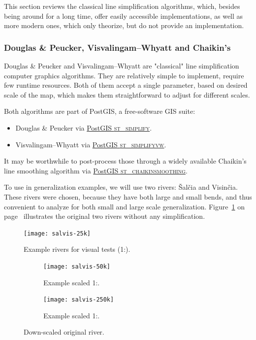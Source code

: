 \documentclass[a4paper]{article}
\newcommand{\onpage}[1]{\ref{#1} on page~\pageref{#1}}
\newcommand{\DP}{Douglas \& Peucker}
\newcommand{\VW}{Visvalingam--Whyatt}
\begin{document}
This section reviews the classical line simplification algorithms, which,
besides being around for a long time, offer easily accessible implementations,
as well as more modern ones, which only theorize, but do not provide an
implementation.

\subsubsection{{\DP}, {\VW} and Chaikin's}
\label{sec:dp-vw-chaikin}

{\DP}\cite{douglas1973algorithms} and {\VW}\cite{visvalingam1993line} are
"classical" line simplification computer graphics algorithms. They are
relatively simple to implement, require few runtime resources. Both of them
accept a single parameter, based on desired scale of the map, which makes them
straightforward to adjust for different scales.

Both algorithms are part of PostGIS, a free-software GIS suite:
\begin{itemize}
    \item {\DP} via
        \href{https://postgis.net/docs/ST_Simplify.html}{PostGIS \textsc{st\_simplify}}.

    \item {\VW} via
        \href{https://postgis.net/docs/ST_SimplifyVW.html}{PostGIS
        \textsc{st\_simplifyvw}}.
\end{itemize}

It may be worthwhile to post-process those through a widely available Chaikin's
line smoothing algorithm\cite{chaikin1974algorithm} via
\href{https://postgis.net/docs/ST_ChaikinSmoothing.html}{PostGIS
\textsc{st\_chaikinsmoothing}}.

To use in generalization examples, we will use two rivers: Šalčia and Visinčia.
These rivers were chosen, because they have both large and small bends, and
thus convenient to analyze for both small and large scale generalization.
Figure~\onpage{fig:salvis-25} illustrates the original two rivers without any
simplification.

\begin{figure}[ht]
    \centering
    \texttt{[image: salvis-25k]}
    \caption{Example rivers for visual tests (1:{}).}
    \label{fig:salvis-25}
\end{figure}

\begin{figure}[ht]
    \centering
    \begin{subfigure}[b]{.49\textwidth}
        \texttt{[image: salvis-50k]}
        \caption{Example scaled 1:.}
    \end{subfigure}
    \hfill
    \begin{subfigure}[b]{.49\textwidth}
        \centering
        \texttt{[image: salvis-250k]}
        \caption{Example scaled 1:.}
    \end{subfigure}
    \caption{Down-scaled original river.}
    \label{fig:salvis-50-250}
\end{figure}
\end{document}
